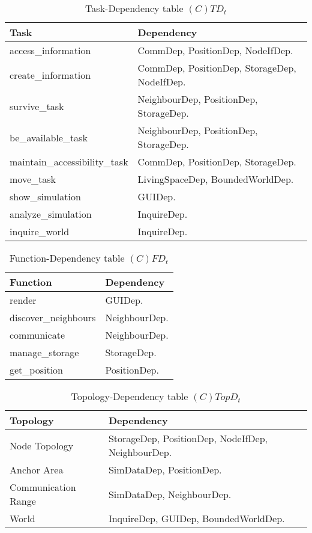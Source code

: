 \begin{table}[H]
	\centering
	\begin{tabular}{|p{5cm}|p{7cm}|}
			\hline
			\textbf{Task} & \textbf{Dependency} \\
			\hline
			access\_information & CommDep, PositionDep, NodeIfDep. \\
			\hline
			create\_information & CommDep, PositionDep, StorageDep, NodeIfDep. \\
			\hline
			survive\_task & NeighbourDep, PositionDep, StorageDep. \\
			\hline
			be\_available\_task &  NeighbourDep, PositionDep, StorageDep. \\
			\hline
			maintain\_accessibility\_task & CommDep, PositionDep, StorageDep. \\
			\hline
			move\_task & LivingSpaceDep, BoundedWorldDep. \\
			\hline
			show\_simulation & GUIDep. \\
			\hline
			analyze\_simulation & InquireDep. \\
			\hline
			inquire\_world & InquireDep. \\
			\hline
		\end{tabular}
	\caption{Task-Dependency table $(C)TD_t$}
	\label{tab:ctdt}
\end{table}

\begin{table}[H]
	\centering
	\begin{tabular}{|p{5cm}|p{7cm}|}
			\hline
			\textbf{Function} & \textbf{Dependency} \\
			\hline
			render & GUIDep. \\
			\hline
			discover\_neighbours & NeighbourDep. \\
			\hline
			communicate & NeighbourDep. \\
			\hline
			manage\_storage & StorageDep. \\
			\hline
			get\_position & PositionDep. \\
			\hline
		\end{tabular}
	\caption{Function-Dependency table $(C)FD_t$}
	\label{tab:cfdt}
\end{table}

\begin{table}[H]
	\centering
	\begin{tabular}{|p{4cm}|p{8cm}|}
			\hline
			\textbf{Topology} & \textbf{Dependency} \\
			\hline
			Node Topology & StorageDep, PositionDep, NodeIfDep, NeighbourDep. \\
			\hline
			Anchor Area & SimDataDep, PositionDep.\\
			\hline
			Communication Range & SimDataDep, NeighbourDep. \\
			\hline
			World & InquireDep, GUIDep, BoundedWorldDep. \\
			\hline
		\end{tabular}
	\caption{Topology-Dependency table $(C)TopD_t$}
	\label{tab:ctopdt}
\end{table}

